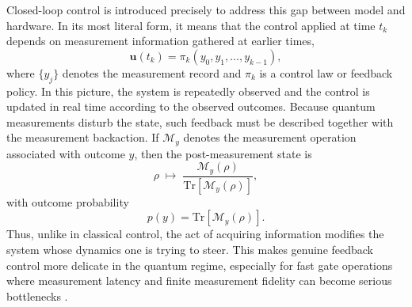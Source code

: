 Closed-loop control is introduced precisely to address this gap between model and hardware. In its most literal form, it means that the control applied at time $t_k$ depends on measurement information gathered at earlier times,
\begin{equation}
\bm{u}(t_k)
=
\pi_k\!\left(y_0,y_1,\dots,y_{k-1}\right),
\label{eq:closed_loop_policy}
\end{equation}
where $\{y_j\}$ denotes the measurement record and $\pi_k$ is a control law or feedback policy. In this picture, the system is repeatedly observed and the control is updated in real time according to the observed outcomes. Because quantum measurements disturb the state, such feedback must be described together with the measurement backaction. If $\mathcal{M}_{y}$ denotes the measurement operation associated with outcome $y$, then the post-measurement state is
\begin{equation}
\rho
\;\longmapsto\;
\frac{\mathcal{M}_{y}(\rho)}
{\mathrm{Tr}\!\left[\mathcal{M}_{y}(\rho)\right]},
\label{eq:measurement_backaction}
\end{equation}
with outcome probability
\begin{equation}
p(y)=\mathrm{Tr}\!\left[\mathcal{M}_{y}(\rho)\right].
\label{eq:measurement_probability}
\end{equation}
Thus, unlike in classical control, the act of acquiring information modifies the system whose dynamics one is trying to steer. This makes genuine feedback control more delicate in the quantum regime, especially for fast gate operations where measurement latency and finite measurement fidelity can become serious bottlenecks \cite{Koch2022}.


